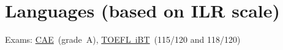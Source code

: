 \documentclass[11pt,a4paper,oneside,roman]{moderncv}
\begin{document}
\section{Languages \small{(based on ILR scale)}}
  {Exams:
    \href{http://www.cambridgeenglish.org/exams/advanced/}{CAE}~(grade~A),
    \href{http://www.ets.org/toefl}{TOEFL~iBT}~(115/120 and 118/120)
  }


\end{document}
